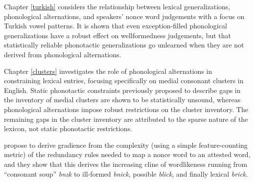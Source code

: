 Chapter \ref{turkish} considers the relationship between lexical generalizations, phonological alternations, and speakers' nonce word judgements with a focus on Turkish vowel patterns. It is shown that even exception-filled phonological generalizations have a robust effect on wellformedness judgements, but that statistically reliable phonotactic generalizations go unlearned when they are not derived from phonological alternations.

Chapter \ref{clusters} investigates the role of phonological alternations in constraining lexical entries, focusing specifically on medial consonant clusters in English. Static phonotactic constraints previously proposed to describe gaps in the inventory of medial clusters are shown to be statistically unsound, whereas phonological alternations impose robust restrictions on the cluster inventory. The remaining gaps in the cluster inventory are attributed to the sparse nature of the lexicon, not static phonotactic restrictions.

%
%

\citet{Silverman2000}
\citet{Kiparsky1995}
\citet[352f.]{Hale2003a}
\citeauthor{SPE} propose to derive gradience from the complexity (using a simple feature-counting metric) of the redundancy rules needed to map a nonce word to an attested word, and they show that this derives the increasing cline of wordlikeness running from ``consonant soup'' \emph{bnzk} to ill-formed \emph{bnick}, possible \emph{blick}, and finally lexical \emph{brick}.

